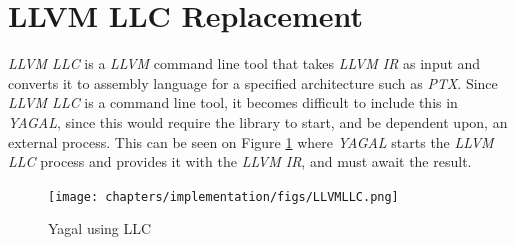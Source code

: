 \section{LLVM LLC Replacement}
\textit{LLVM LLC} is a \textit{LLVM} command line tool that takes \textit{LLVM IR} as input and converts it to assembly language for a specified architecture such as \textit{PTX}. Since \textit{LLVM LLC} is a command line tool, it becomes difficult to include this in \textit{YAGAL}, since this would require the library to start, and be dependent upon, an external process. This can be seen on Figure \ref{fig:yagalLLC} where \textit{YAGAL} starts the \textit{LLVM LLC} process and provides it with the \textit{LLVM IR}, and must await the result.

\begin{figure}[!htb]
    \centering
    \begin{minipage}{.7\textwidth}
        \centering
        \texttt{[image: chapters/implementation/figs/LLVMLLC.png]}
        \caption{Yagal using LLC}
        \label{fig:yagalLLC}
    \end{minipage}
    \begin{minipage}{0.4\textwidth}
        \centering

\end{minipage}
\end{figure}
